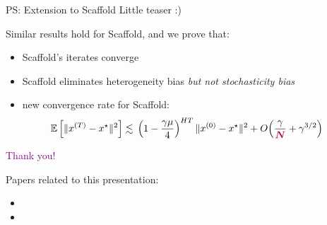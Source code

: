 \documentclass[aspectratio=169,12pt]{beamer}
\begin{document}
\begin{frame}{PS: Extension to Scaffold}
  Little teaser :)
  
  Similar results hold for Scaffold, and we prove that:
  \begin{itemize}
  \item Scaffold's iterates converge
  \item Scaffold eliminates heterogeneity bias \emph{but not stochasticity bias}
    \item new convergence rate for Scaffold:
      \begin{align*}
        \mathbb{E}\left[ \| x^{(T)} - x^\star \|^2 \right] 
        & \lesssim{} \left( 1 - \frac{\gamma \mu}{4} \right)^{HT}
          \| x^{(0)} - x^\star \|^2
             + O\Big( \frac{\gamma }{\textcolor{purple}{\boldsymbol{N}}}
             + \gamma^{3/2}
             \Big)
      \end{align*}
      
    \end{itemize}
\end{frame}


\begin{frame}
  \begin{center}
    \huge \textcolor{purple}{
      Thank you!
      }
    \end{center}

    Papers related to this presentation:
    \vspace{-1em}
    \begin{itemize}
    \item \small {}
    \item \small {}
    \end{itemize}

    
\end{frame}



\end{document}
